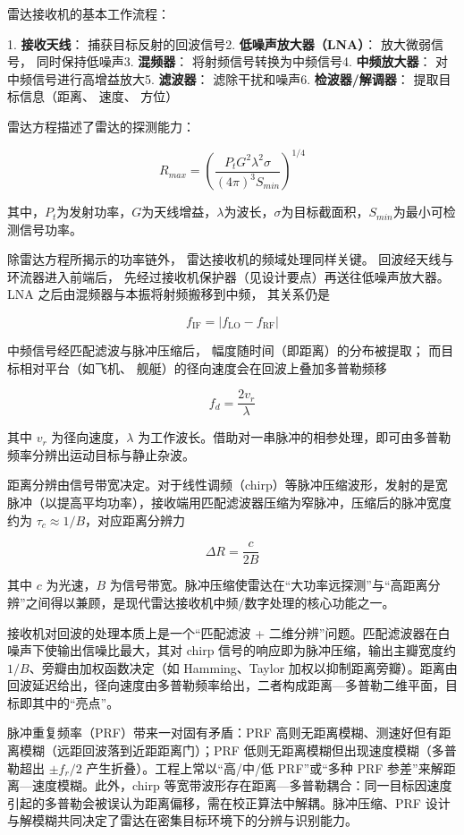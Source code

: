 雷达接收机的基本工作流程：

1. 
\textbf{接收天线}：
捕获目标反射的回波信号2. 
\textbf{低噪声放大器（LNA）}：
放大微弱信号，
同时保持低噪声3. 
\textbf{混频器}：
将射频信号转换为中频信号4. 
\textbf{中频放大器}：
对中频信号进行高增益放大5. 
\textbf{滤波器}：
滤除干扰和噪声6. 
\textbf{检波器/解调器}：
提取目标信息（距离、
速度、
方位）

雷达方程描述了雷达的探测能力：

\[ R_{max} = \left( \frac{P_t G^2 \lambda^2 \sigma}{(4\pi)^3 S_{min}} \right)^{1/4} \]

其中，$P_t$为发射功率，$G$为天线增益，$\lambda$为波长，$\sigma$为目标截面积，$S_{min}$为最小可检测信号功率。

除雷达方程所揭示的功率链外，
雷达接收机的频域处理同样关键。
回波经天线与环流器进入前端后，
先经过接收机保护器（见设计要点）再送往低噪声放大器。
LNA 之后由混频器与本振将射频搬移到中频，
其关系仍是

\[
f_{\mathrm{IF}}=\left| f_{\mathrm{LO}}-f_{\mathrm{RF}} 
\right|
\]

中频信号经匹配滤波与脉冲压缩后，
幅度随时间（即距离）的分布被提取；
而目标相对平台（如飞机、
舰艇）的径向速度会在回波上叠加多普勒频移

\[
f_d=\frac{2v_r}{\lambda}
\]

其中 $v_r$ 为径向速度，$\lambda$ 为工作波长。借助对一串脉冲的相参处理，即可由多普勒频率分辨出运动目标与静止杂波。

距离分辨由信号带宽决定。对于线性调频（chirp）等脉冲压缩波形，发射的是宽脉冲（以提高平均功率），接收端用匹配滤波器压缩为窄脉冲，压缩后的脉冲宽度约为 $\tau_c\approx 1/B$，对应距离分辨力

\[
\Delta R=\frac{c}{2B}
\]

其中 $c$ 为光速，$B$ 为信号带宽。脉冲压缩使雷达在“大功率远探测”与“高距离分辨”之间得以兼顾，是现代雷达接收机中频/数字处理的核心功能之一。

接收机对回波的处理本质上是一个“匹配滤波 + 二维分辨”问题。匹配滤波器在白噪声下使输出信噪比最大，其对 chirp 信号的响应即为脉冲压缩，输出主瓣宽度约 $1/B$、旁瓣由加权函数决定（如 Hamming、Taylor 加权以抑制距离旁瓣）。距离由回波延迟给出，径向速度由多普勒频率给出，二者构成距离—多普勒二维平面，目标即其中的“亮点”。

脉冲重复频率（PRF）带来一对固有矛盾：PRF 高则无距离模糊、测速好但有距离模糊（远距回波落到近距距离门）；PRF 低则无距离模糊但出现速度模糊（多普勒超出 $\pm f_r/2$ 产生折叠）。工程上常以“高/中/低 PRF”或“多种 PRF 参差”来解距离—速度模糊。此外，chirp 等宽带波形存在距离—多普勒耦合：同一目标因速度引起的多普勒会被误认为距离偏移，需在校正算法中解耦。脉冲压缩、PRF 设计与解模糊共同决定了雷达在密集目标环境下的分辨与识别能力。

